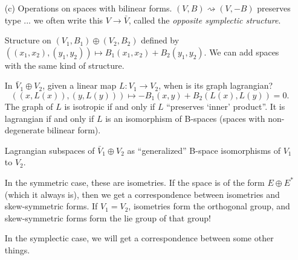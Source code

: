 \begin{itemize}
  \item[(c)]  Operations on spaces with bilinear forms.
  $(V,B)\rightsquigarrow (V,-B)$ preserves type ... we often write
  this $V\to \bar V$, called the \emph{opposite symplectic
  structure}.

  Structure on $(V_1,B_1)\oplus (V_2,B_2)$ defined by
  $((x_1,x_2),(y_1,y_2))\mapsto B_1(x_1,x_2)+B_2(y_1,y_2)$.  We
  can add spaces with the same kind of structure.

  In $\bar V_1\oplus V_2$, given a linear map $L:V_1\to V_2$, when
  is its graph lagrangian?
 \[
    ((x,L(x)),(y,L(y)))\mapsto -B_1(x,y)+B_2(L(x),L(y)) = 0.
 \]
 The graph of $L$ is isotropic if and only if $L$ ``preserves
 `inner' product''.  It is lagrangian if and only if $L$ is an
 isomorphism of B-spaces (spaces with non-degenerate bilinear
 form).

 Lagrangian subspaces of $\bar V_1\oplus V_2$ as ``generalized''
 B-space isomorphisms of $V_1$ to $V_2$.

 In the symmetric case, these are isometries.  If the space is of
 the form $E\oplus E^*$ (which it always is), then we get a
 correspondence between isometries and skew-symmetric forms.  If
 $V_1=V_2$, isometries form the orthogonal group, and
 skew-symmetric forms form the lie group of that group!

 In the symplectic case, we will get a correspondence between some
 other things.

  \end{itemize}
